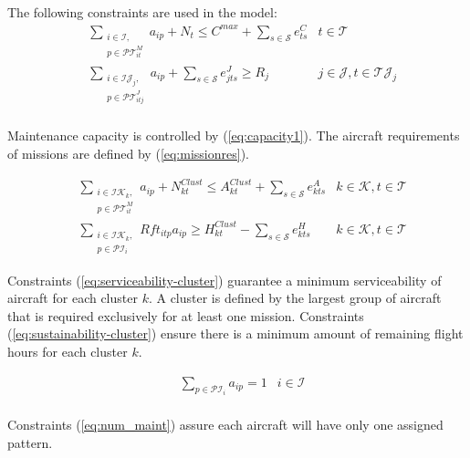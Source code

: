 \documentclass[a4paper,11pt]{article}
\begin{document}
      The following constraints are used in the model:
      \begin{align}
          & \sum_{\substack{i \in \mathcal{I}, \\ p \in \mathcal{PT}^{M}_{it}}} a_{ip} + N_t \leq C^{max} + \sum_{s \in \mathcal{S}} e^{C}_{ts}
                  & t \in \mathcal{T} \label{eq:capacity1}\\
          & \sum_{\substack{i \in \mathcal{IJ}_j, \\ p \in \mathcal{PT}^{J}_{itj}}} a_{ip} + \sum_{s \in \mathcal{S}} e^{J}_{jts} \geq R_j
                  & j \in \mathcal{J}, t \in \mathcal{TJ}_j  \label{eq:missionres}\\
      \end{align}

      Maintenance capacity is controlled by (\ref{eq:capacity1}). The aircraft requirements of missions are defined by (\ref{eq:missionres}).

      \begin{align}
         & \sum_{\substack{i \in \mathcal{IK}_k, \\ p \in \mathcal{PT}^{M}_{it}}} a_{ip} + N^{Clust}_{kt} \leq A^{Clust}_{kt} + \sum_{s \in \mathcal{S}} e^{A}_{kts}
              & k \in \mathcal{K}, t \in \mathcal{T} \label{eq:serviceability-cluster}\\
         & \sum_{\substack{i \in \mathcal{IK}_k, \\ p \in \mathcal{PI}_i}} Rft_{itp} a_{ip} \geq H^{Clust}_{kt} - \sum_{s \in \mathcal{S}} e^{H}_{kts}
              & k \in \mathcal{K}, t \in \mathcal{T} \label{eq:sustainability-cluster}
      \end{align}

      Constraints (\ref{eq:serviceability-cluster}) guarantee a minimum serviceability of aircraft for each cluster $k$. A cluster is defined by the largest group of aircraft that is required exclusively for at least one mission. 
      Constraints (\ref{eq:sustainability-cluster}) ensure there is a minimum amount of remaining flight hours for each cluster $k$.

      \begin{align}
          & \sum_{p \in \mathcal{PI}_i} a_{ip} =  1 
            & i \in \mathcal{I}\label{eq:num_maint} \\
      \end{align}

      Constraints (\ref{eq:num_maint}) assure each aircraft will have only one assigned pattern.
\end{document}
